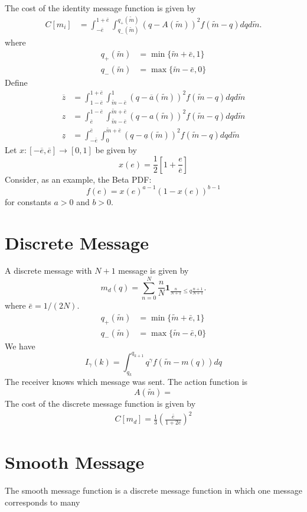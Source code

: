 \documentclass{article}
\begin{document}
The cost of the identity message function is given by
\begin{align}
	C[m_{i}]&=\int_{-\bar{e}}^{1+\bar{e}}{\int_{q_{-}(\widetilde{m})}^{q_{+}(\widetilde{m})}{(q-A(\widetilde{m}))^{2}f(\widetilde{m}-q)dq}d\widetilde{m}}.
\end{align}
where
\begin{align}
	q_{+}(\widetilde{m})&=\min\{\widetilde{m}+\bar{e},1\}\\
	q_{-}(\widetilde{m})&=\max\{\widetilde{m}-\bar{e},0\}
\end{align}
Define
\begin{align}
	\overline{z}&=\int_{1-\bar{e}}^{1+\bar{e}}{\int_{\widetilde{m}-\bar{e}}^{1}{(q-\overline{a}(\widetilde{m}))^{2}f(\widetilde{m}-q)dq}d\widetilde{m}}\\
	z&=\int_{\bar{e}}^{1-\bar{e}}{\int_{\widetilde{m}-\bar{e}}^{\widetilde{m}+\bar{e}}{(q-a(\widetilde{m}))^{2}f(\widetilde{m}-q)dq}d\widetilde{m}}\\
	\underline{z}&=\int_{-\bar{e}}^{\bar{e}}{\int_{0}^{\widetilde{m}+\bar{e}}{(q-\underline{a}(\widetilde{m}))^{2}f(\widetilde{m}-q)dq}d\widetilde{m}}
\end{align}
\noindent Let $x:[-\overline{e},\overline{e}]\rightarrow[0,1]$ be given by
\begin{equation}
	x(e)=\frac{1}{2}\left[1+\frac{e}{\overline{e}}\right]
\end{equation}
Consider, as an example, the Beta PDF:
\begin{equation}
	f(e)=x(e)^{a-1}(1-x(e))^{b-1}
\end{equation}
for constants $a>0$ and $b>0$. 

\section{Discrete Message}
A discrete message with $N+1$ message is given by
\begin{equation}
	m_{d}(q)=\sum_{n=0}^{N}\frac{n}{N}\mathbf{1}_{\frac{n}{N+1}\leq q\frac{n+1}{N+1}}.
\end{equation}
where $\bar{e}=1/(2N)$. 
\begin{align}
	q_{+}(\widetilde{m})&=\min\{\widetilde{m}+\bar{e},1\}\\
	q_{-}(\widetilde{m})&=\max\{\widetilde{m}-\bar{e},0\}
\end{align}
We have
\begin{equation}
	I_{\gamma}(k)=\int_{q_{k}}^{q_{k+1}}{q^\gamma f(\widetilde{m}-m(q))dq}
\end{equation}
The receiver knows which message was sent. The action function is
\begin{equation}
	A(\widetilde{m})=
\end{equation}
The cost of the discrete message function is given by
\begin{align}
	C[m_{d}]=\frac{1}{3}\left(\frac{\bar{e}}{1+2\bar{e}}\right)^{2}
\end{align}

\section{Smooth Message}
	The smooth message function is a discrete message function in which one message corresponds to many 
\end{document}
